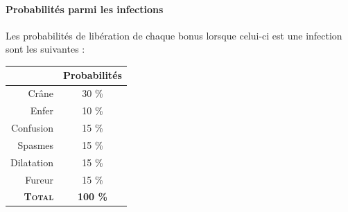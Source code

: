 \paragraph{Probabilités parmi les infections}
Les probabilités de libération de chaque bonus lorsque celui-ci est une infection sont les suivantes :\begin{center}
\begin{tabular}{|r|c|}
\hline 
& Probabilités \\ 
\hline 
Crâne & 30 \% \\ 
\hline 
Enfer & 10 \% \\ 
\hline 
Confusion & 15 \% \\ 
\hline 
Spasmes & 15 \% \\ 
\hline 
Dilatation & 15 \% \\ 
\hline 
Fureur & 15 \% \\ 
\hline 
\textbf{\textsc{Total}} & \textbf{100 \%} \\ 
\hline 
\end{tabular} 
\end{center}
